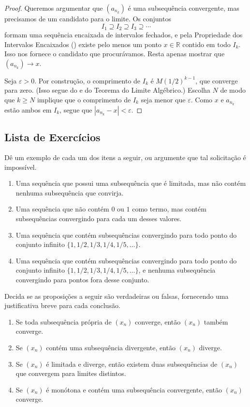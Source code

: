 \begin{proof}
Queremos argumentar que $(a_{n_k})$ é uma subsequência convergente, mas precisamos de um candidato para o limite. Os conjuntos
\[
I_1 \supseteq I_2 \supseteq I_3 \supseteq \cdots
\]
formam uma sequência encaixada de intervalos fechados, e pela Propriedade dos Intervalos Encaixados () existe pelo menos um ponto $x \in \mathbb{R}$ contido em todo $I_k$. Isso nos fornece o candidato que procurávamos. Resta apenas mostrar que $(a_{n_k}) \to x$. 

Seja $\varepsilon > 0$. Por construção, o comprimento de $I_k$ é $M(1/2)^{k-1}$, que converge para zero. (Isso segue do  e do Teorema do Limite Algébrico.) Escolha $N$ de modo que $k \geq N$ implique que o comprimento de $I_k$ seja menor que $\varepsilon$. Como $x$ e $a_{n_k}$ estão ambos em $I_k$, segue que $|a_{n_k} - x| < \varepsilon$.
\end{proof}

\subsection{Lista de Exercícios}\label{subsec:exercicios-bolzano-weierstrass}

\begin{exercise}\label{ex:2-5-1}
Dê um exemplo de cada um dos itens a seguir, ou argumente que tal solicitação é impossível.
\begin{enumerate}[label=(\alph*)]
\item Uma sequência que possui uma subsequência que é limitada, mas não contém nenhuma subsequência que convirja.
\item Uma sequência que não contém $0$ ou $1$ como termo, mas contém subsequências convergindo para cada um desses valores.
\item Uma sequência que contém subsequências convergindo para todo ponto do conjunto infinito $\{1, 1/2, 1/3, 1/4, 1/5, \dots\}$.
\item Uma sequência que contém subsequências convergindo para todo ponto do conjunto infinito $\{1, 1/2, 1/3, 1/4, 1/5, \dots\}$, e nenhuma subsequência convergindo para pontos fora desse conjunto.
\end{enumerate}
\end{exercise}

\begin{exercise}\label{ex:2-5-2}
Decida se as proposições a seguir são verdadeiras ou falsas, fornecendo uma justificativa breve para cada conclusão.
\begin{enumerate}[label=(\alph*)]
\item Se toda subsequência própria de $(x_n)$ converge, então $(x_n)$ também converge.
\item Se $(x_n)$ contém uma subsequência divergente, então $(x_n)$ diverge.
\item Se $(x_n)$ é limitada e diverge, então existem duas subsequências de $(x_n)$ que convergem para limites distintos.
\item Se $(x_n)$ é monótona e contém uma subsequência convergente, então $(x_n)$ converge.
\end{enumerate}
\end{exercise}

